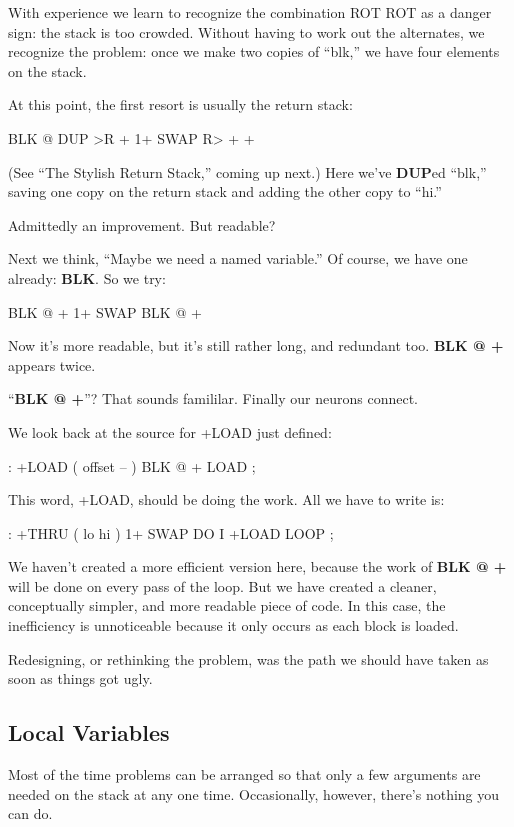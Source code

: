 With experience we learn to recognize the combination ROT ROT as
a danger sign: the stack is too crowded. Without having to work out the
alternates, we recognize the problem: once we make two copies of ``blk,''
we have four elements on the stack.

At this point, the first resort is usually the return stack:

\begin{Code}
BLK @  DUP >R  + 1+  SWAP R> + +
\end{Code}
(See ``The Stylish Return Stack,'' coming up next.) Here we've \textbf{DUP}ed
``blk,'' saving one copy on the return stack and adding the other copy to
``hi.''

Admittedly an improvement. But readable?

Next we think, ``Maybe we need a named variable.'' Of course, we
have one already: \textbf{BLK}. So we try:

\begin{Code}
BLK @  + 1+  SWAP BLK @ +
\end{Code}
Now it's more readable, but it's still rather long, and redundant too.
\textbf{BLK @ +} appears twice.

``\textbf{BLK @ +}''? That sounds famililar. Finally our neurons connect.

We look back at the source for +LOAD just defined:

\begin{Code}
: +LOAD  ( offset -- )  BLK @ +  LOAD ;
\end{Code}
This word, +LOAD, should be doing the work. All we have to write is:

\begin{Code}
: +THRU  ( lo hi )  1+ SWAP  DO  I +LOAD  LOOP ;
\end{Code}
We haven't created a more efficient version here, because the work of
\textbf{BLK @ +} will be done on every pass of the loop. But we have created a
cleaner, conceptually simpler, and more readable piece of code. In this
case, the inefficiency is unnoticeable because it only occurs as each block
is loaded.

Redesigning, or rethinking the problem, was the path we should
have taken as soon as things got ugly.

\subsection{Local Variables}

Most of the time problems can be arranged so that only a few arguments
are needed on the stack at any one time. Occasionally, however, there's
nothing you can do.

